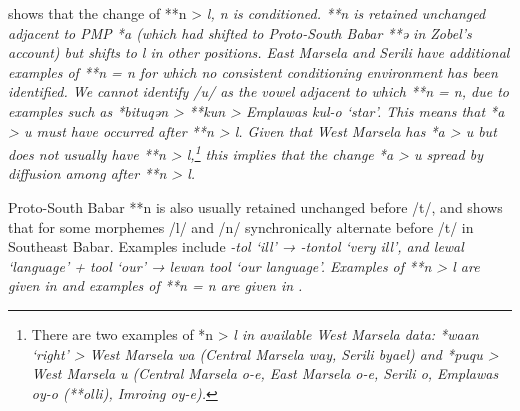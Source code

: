 \citet{Zobel2018} shows that the change of **n > \it{l, n}
is conditioned.
**n is retained unchanged adjacent to PMP *a (which had shifted
to Proto-South Babar **ə in Zobel’s account) but shifts to \it{l} in other positions.
East Marsela and Serili have additional examples of **n = \it{n}
for which no consistent conditioning environment has been identified.
We cannot identify /u/ as the vowel adjacent to which **n = \it{n},
due to examples such as *bituqən > **kun > Emplawas \it{kul-o} ‘star’.
This means that *a > \it{u} must have occurred after **n > \it{l}.
Given that West Marsela has *a > \it{u} but does not usually
have **n > \it{l},\footnote{
		There are two examples of *n > \it{l}
		in available West Marsela data: *waan ‘right’ > West Marsela
		\it{wa} (Central Marsela \it{way},
		Serili \it{byael}) and *puqu > West Marsela \it{u}
		(Central Marsela \it{o-e}, East Marsela \it{o-e}, Serili \it{o},
		Emplawas \it{oy-o} (**olli), Imroing \it{oy-e}).}
this implies that the change *a > \it{u} spread by diffusion
among  after **n > \it{l}.

Proto-South Babar **n is also usually retained unchanged before
/t/, and \citet[102]{Steinhauer2009} shows that for some morphemes
/l/ and /n/ synchronically alternate before /t/ in Southeast Babar.
Examples include \it{-tol} ‘ill’ \it{→ -ton{\tl}tol} ‘very ill’,
and \it{lewal} ‘language’ + \it{tool} ‘our’ → \it{lewan tool} ‘our language’.
Examples of 
**n > \it{l} are given in  
and
examples of
**n = \it{n} are given in .

